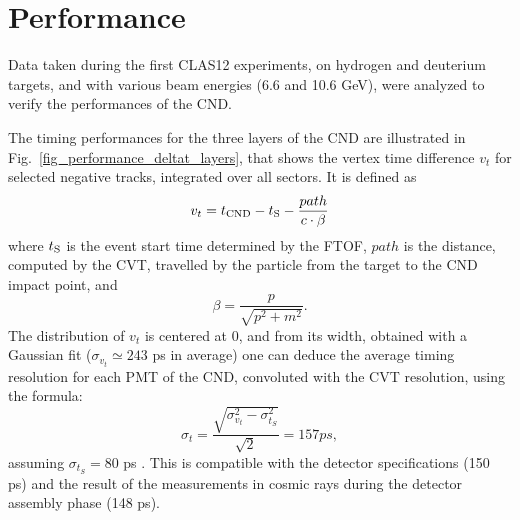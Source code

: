 \section{Performance}

Data taken during the first CLAS12 experiments, on hydrogen and deuterium targets, and with various beam energies (6.6 and 10.6 GeV), were analyzed to verify the performances of the CND. 

The timing performances for the three layers of the CND are illustrated in Fig.~\ref{fig_performance_deltat_layers}, that shows the vertex time difference $v_t$ for selected negative tracks, integrated over all sectors. It is defined as
\begin{equation}\label{eq_vtp_definition}
v_t=t_{\rm{CND}}-t_{\rm{S}}-\frac{path}{c \cdot \beta}
\end{equation}
where $t_{\rm{S}}$ is the event start time determined by the FTOF, $path$ is the distance, computed by the CVT, travelled by the particle from the target to the CND impact point, and
\begin{equation}\label{eq_beta_definition}
\beta=\frac{p}{\sqrt{p^2+m^2}} .
\end{equation}
The distribution of $v_t$ is centered at 0, and from its width, obtained with a Gaussian fit ($\sigma_{v_t}\simeq 243$ ps in average) one can deduce the average timing resolution for each PMT of the CND, convoluted with the CVT resolution, using the formula:
\begin{equation}\label{eq_resolution}
\sigma_t=\frac{\sqrt{\sigma_{v_t}^2-\sigma_{t_{S}}^2}}{\sqrt{2}}=157 ps, 
\end{equation}
assuming $\sigma_{t_{S}}=80$ ps \cite{ftofref}. This is compatible with the detector specifications (150 ps) and the result of the measurements in cosmic rays during the detector assembly phase \cite{Niccolai:2018qzm} (148 ps).

